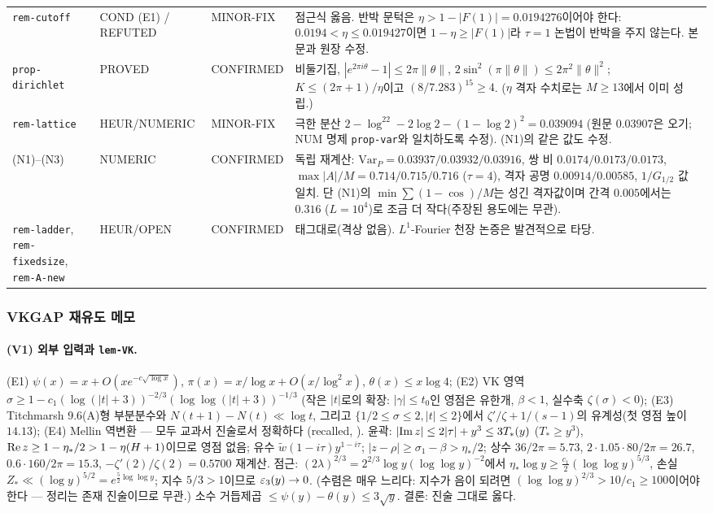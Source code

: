 \begin{center}
\begin{longtable}{p{}p{}p{}p{}}
\texttt{rem-cutoff} & COND (E1) / REFUTED & MINOR-FIX & 점근식 옳음. 반박 문턱은 $\eta>1-|F(1)|=0.0194276$이어야 한다: $0.0194<\eta\le0.019427$이면 $1-\eta\ge|F(1)|$라 $\tau=1$ 논법이 반박을 주지 않는다. 본문과 원장 수정.\\
\texttt{prop-dirichlet} & PROVED & CONFIRMED & 비둘기집, $|e^{2\pi i\theta}-1|\le2\pi\|\theta\|$, $2\sin^2(\pi\|\theta\|)\le2\pi^2\|\theta\|^2$; $K\le(2\pi+1)/\eta$이고 $(8/7.283)^{15}\ge4$. ($\eta$ 격자 수치로는 $M\ge13$에서 이미 성립.)\\
\texttt{rem-lattice} & HEUR/NUMERIC & MINOR-FIX & 극한 분산 $2-\log^22-2\log2-(1-\log2)^2=0.039094$ (원문 $0.03907$은 오기; NUM 명제 \texttt{prop-var}와 일치하도록 수정). (N1)의 같은 값도 수정.\\
(N1)--(N3) & NUMERIC & CONFIRMED & 독립 재계산: $\mathrm{Var}_P=0.03937/0.03932/0.03916$, 쌍 비 $0.0174/0.0173/0.0173$, $\max|A|/M=0.714/0.715/0.716$ ($\tau=4$), 격자 공명 $0.00914/0.00585$, $1/G_{1/2}$ 값 일치. 단 (N1)의 $\min\sum(1-\cos)/M$는 성긴 격자값이며 간격 $0.005$에서는 $0.316$ ($L=10^4$)로 조금 더 작다(주장된 용도에는 무관).\\
\texttt{rem-ladder}, \texttt{rem-fixedsize}, \texttt{rem-A-new} & HEUR/OPEN & CONFIRMED & 태그대로(격상 없음). $L^1$-Fourier 천장 논증은 발견적으로 타당.\\
\bottomrule
\end{longtable}
\end{center}

\subsubsection{VKGAP 재유도 메모}\label{AUD3:ssec-vk-notes}

\paragraph{(V1) 외부 입력과 \texttt{lem-VK}.}
(E1) $\psi(x)=x+O(xe^{-c\sqrt{\log x}})$, $\pi(x)=x/\log x+O(x/\log^2x)$, $\theta(x)\le x\log4$; (E2) VK 영역 $\sigma\ge1-c_1(\log(|t|+3))^{-2/3}(\log\log(|t|+3))^{-1/3}$
(작은 $|t|$로의 확장: $|\gamma|\le t_0$인 영점은 유한개, $\beta<1$, 실수축 $\zeta(\sigma)<0$); (E3) Titchmarsh 9.6(A)형 부분분수와 $N(t+1)-N(t)\ll\log t$,
그리고 $\{1/2\le\sigma\le2,|t|\le2\}$에서 $\zeta'/\zeta+1/(s-1)$의 유계성(첫 영점 높이 $14.13$); (E4) Mellin 역변환 --- 모두 교과서 진술로서 정확하다 (recalled, \EXT).
윤곽: $|{\rm Im}\,z|\le2|\tau|+y^3\le3T_*(y)$ ($T_*\ge y^3$), ${\rm Re}\,z\ge1-\eta_*/2>1-\eta(H+1)$이므로 영점 없음; 유수 $\tilde w(1-i\tau)y^{1-i\tau}$;
$|z-\rho|\ge\sigma_1-\beta>\eta_*/2$; 상수 $36/2\pi=5.73$, $2\cdot1.05\cdot80/2\pi=26.7$, $0.6\cdot160/2\pi=15.3$, $-\zeta'(2)/\zeta(2)=0.5700$ 재계산.
점근: $(2\lambda)^{2/3}=2^{2/3}\log y(\log\log y)^{-2}$에서 $\eta_*\log y\ge\frac{c_1}2(\log\log y)^{5/3}$, 손실 $Z_*\ll(\log y)^{5/2}=e^{\frac52\log\log y}$;
지수 $5/3>1$이므로 $\varepsilon_3(y)\to0$. (수렴은 매우 느리다: 지수가 음이 되려면 $(\log\log y)^{2/3}>10/c_1\ge100$이어야 한다 --- 정리는 존재 진술이므로 무관.)
소수 거듭제곱 $\le\psi(y)-\theta(y)\le3\sqrt y$. 결론: 진술 그대로 옳다.

